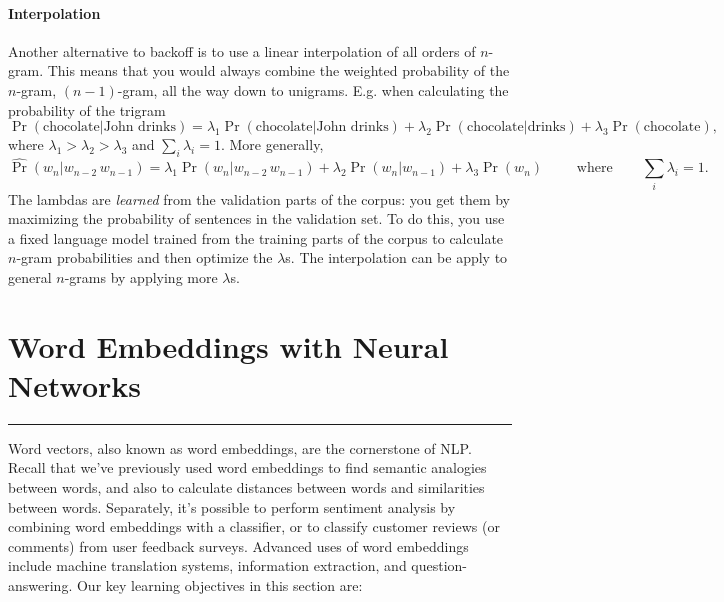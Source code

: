 \documentclass[12pt]{article}
\begin{document}
\paragraph{Interpolation} Another alternative to backoff is to use a linear interpolation of all orders of $n$-gram. This means that you would always combine the weighted probability of the $n$-gram, $(n-1)$-gram, all the way down to unigrams. E.g. when calculating the probability of the trigram
\[
\Pr(\textrm{chocolate} | \textrm{John drinks}) = \lambda_1 \Pr(\textrm{chocolate} | \textrm{John drinks}) + \lambda_2 \Pr(\textrm{chocolate} | \textrm{drinks}) + \lambda_3 \Pr(\textrm{chocolate}),
\]
where $\lambda_1 > \lambda_2 > \lambda_3$ and $\sum_i \lambda_i = 1$. More generally,
\[
  \hat \Pr(w_n | w_{n-2} \, w_{n-1}) = \lambda_1 \Pr(w_n | w_{n-2} \, w_{n-1}) + \lambda_2 \Pr(w_{n} | w_{n-1}) + \lambda_3 \Pr(w_n) \hspace{25pt} \textrm{ where} \hspace{25pt} \sum_i \lambda_i = 1.
\]
The lambdas are \emph{learned} from the validation parts of the corpus: you get them by maximizing the probability of sentences in the validation set. To do this, you use a fixed language model trained from the training parts of the corpus to calculate $n$-gram probabilities and then optimize the $\lambda$s. The interpolation can be apply to general $n$-grams by applying more $\lambda$s.

\section{Word Embeddings with Neural Networks}\vspace{.1pt} \hrule height 2pt \smallskip \renewcommand{\arraystretch}{1}%
Word vectors, also known as word embeddings, are the cornerstone of NLP. Recall that we've previously used word embeddings to find semantic analogies between words, and also to calculate distances between words and similarities between words.
Separately, it's possible to perform sentiment analysis by combining word embeddings with a classifier, or to classify customer reviews (or comments) from user feedback surveys. Advanced uses of word embeddings include machine translation systems, information extraction, and question-answering.
Our key learning objectives in this section are:
\end{document}
